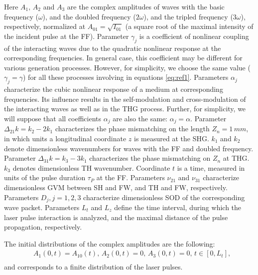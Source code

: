\documentclass[a4paper, 12pt, onecolumn]{extarticle}
\begin{document}
Here \(A_1,\,A_2\) and \(A_3\) are the complex amplitudes of waves with the basic frequency (\(\omega\)), and the doubled frequency (\(2\omega\)), and the tripled frequency (\(3\omega\)), respectively, normalized at \(A_{01}=\sqrt{I_{01}}\) (a square root of the maximal intensity of the incident pulse at the FF). Parameter \(\gamma_j\) is a coefficient of nonlinear coupling of the interacting waves due to the quadratic nonlinear response at the corresponding frequencies. In general case, this coefficient may be different for various generation processes. However, for simplicity, we choose the same value (\(\gamma_j=\gamma\)) for all these processes involving in equations \eqref{eq:ref1}. Parameters \(\alpha_j\) characterize the cubic nonlinear response of a medium at corresponding frequencies. Its influence results in the self-modulation and cross-modulation of the interacting waves as well as in the THG process. Further, for simplicity, we will suppose that all coefficients \(\alpha_j\) are also the same: \(\alpha_j=\alpha\). Parameter \(\Delta_{21} k=k_2 - 2k_1\)  characterizes the phase mismatching on the length $Z_n=1\,mm$, in which units a longitudinal coordinate $z$ is measured at the SHG. \(k_1\) and \(k_2\) denote dimensionless wavenumbers for waves with the FF and doubled frequency. Parameter \(\Delta_{31} k=k_3 - 3k_1\) characterizes the phase mismatching on $Z_n$ at THG. \(k_3\) denotes dimensionless TH wavenumber. Coordinate \(t\) is a time, measured in units of the pulse duration \(\tau_P\) at the FF. Parameters \(\nu_{21}\) and \(\nu_{31}\) characterize dimensionless GVM between SH and FW, and TH and FW, respectively. Parameters \(D_{j}, j=1,2,3\) characterize dimensionless SOD of the corresponding wave packet. Parameters \(L_t\) and \(L_z\) define the time interval, during which the laser pulse interaction is analyzed, and the maximal distance of the pulse propagation, respectively.

The initial distributions of the complex amplitudes are the following:
\begin{equation}\begin{aligned}
\label{eq:first}
&A_1(0,t)=A_{10}(t),\, A_2(0,t)=0,\,A_3(0,t)=0,\, t\in[0,L_t],\\
\end{aligned}\end{equation}
and corresponds to a finite distribution of the laser pulses.
\end{document}
